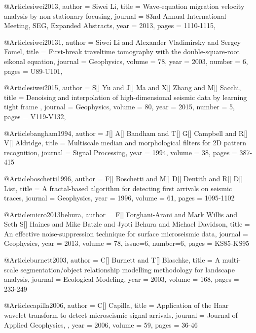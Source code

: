 @Article{siwei2013,
  author = 	 {Siwei Li},
  title = 	 {Wave-equation migration velocity analysis by non-stationary focusing},
  journal = 	 {83nd Annual International Meeting, SEG, Expanded Abstracts},
  year = 	 2013,
  pages =	 {1110-1115},
}

@Article{siwei20131,
  author =	 { Siwei Li and Alexander Vladimirsky and Sergey Fomel},
  title =	 { First-break traveltime tomography with the
double-square-root eikonal equation},
  journal =	 {Geophysics},
  volume =	 78,
  year =	 2003,
  number =	 6,
  pages =	 {U89-U101},
}

@Article{siwei2015,
  author =	 { S[] Yu and J[] Ma and X[] Zhang and M[] Sacchi},
  title =	 { Denoising and interpolation of high-dimensional seismic data by learning tight frame },
  journal =	 {Geophysics},
  volume =	 80,
  year =	 2015,
  number =	 5,
  pages =	 {V119-V132},
}


@Article{bangham1994,
  author = 	 {J[] A[] Bandham and T[] G[] Campbell and R[] V[] Aldridge},
  title = 	 {Multiscale median and morphological filters for 2{D} pattern recognition},
  journal = 	 { Signal Processing},
  year = 	 1994,
  volume = 	 38,
  pages = 	 {387-415}}
  
  @Article{boschetti1996,
  author = 	 {F[] Boschetti and M[] D[] Dentith and R[] D[] List},
  title = 	 {A fractal-based algorithm for detecting first arrivals on seismic traces},
  journal = 	 {Geophysics},
  year = 	 1996,
  volume = 	 61,
  pages = 	 {1095-1102}}

  @Article{micro2013behura,
  author = 	 {F[] Forghani-Arani and Mark Willis and Seth S[] Haines and Mike Batzle and Jyoti Behura and Michael Davidson},
  title = 	 {An effective noise-suppression technique for surface microseismic data},
  journal = 	 {Geophysics},
  year = 	 2013,
  volume = 	 78,
  issue=6,
  number=6,
  pages = 	 {KS85-KS95}}
    
  
  @Article{burnett2003,
  author = 	 {C[] Burnett and T[] Blaschke},
  title = 	 {A multi-scale segmentation/object relationship modelling methodology for landscape analysis},
  journal = 	 {Ecological Modeling},
  year = 	 2003,
  volume = 	 168,
  pages = 	 {233-249}}
  
   @Article{capilla2006,
  author = 	 {C[] Capilla},
  title = 	 {Application of the Haar wavelet transform to detect microseismic signal arrivals},
  journal = 	 {Journal of Applied Geophysics,
},
  year = 	 2006,
  volume = 	 59,
  pages = 	 {36-46}}
  
